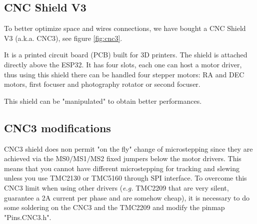 
\subsection{CNC Shield V3}
To better optimize space and wires connections, we have bought a CNC Shield V3 (a.k.a. CNC3), see figure \ref{fig:cnc3}.

It is a printed circuit board (PCB) built for 3D printers.
The shield is attached directly above the ESP32.
It has four slots, each one can host a motor driver, thus using this shield there can be handled four stepper motors: RA and DEC motors, first focuser and photography rotator or second focuser.

This shield can be "manipulated" to obtain better performances.

\subsection{CNC3 modifications}
CNC3 shield does non permit "on the fly" change of microstepping since they are achieved via the MS0\(/\)MS1\(/\)MS2 fixed jumpers below the motor drivers. This means that you cannot have different microstepping for tracking and slewing unless you use TMC2130 or TMC5160 through SPI interface. To overcome this CNC3 limit when using other drivers (\textit{e.g.} TMC2209 that are very silent, guarantee a 2A current per phase and are somehow cheap), it is necessary to do some soldering on the CNC3 and the TMC2209 and modify the pinmap "Pins.CNC3.h".
